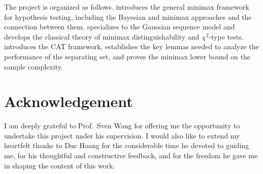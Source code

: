 The project is organized as follows.  introduces the general minimax framework
for hypothesis testing, including the Bayesian and minimax approaches and the connection
between them.  specializes to the Gaussian sequence model and develops the
classical theory of minimax distinguishability and $\chi^2$-type tests. 
introduces the CAT framework, establishes the key lemmas needed to analyze the performance
of the separating set, and proves the minimax lower bound on the sample complexity.

\section*{Acknowledgement}
I am deeply grateful to Prof.~Sven Wang for offering me the opportunity to undertake
this project under his supervision. I would also like to extend my heartfelt thanks to
Duc Hoang for the considerable time he devoted to guiding me, for his thoughtful and
constructive feedback, and for the freedom he gave me in shaping the content of this
work.